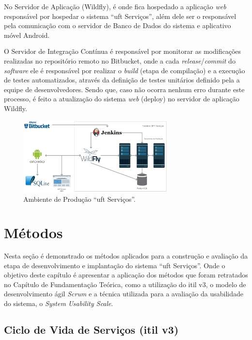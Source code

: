 No Servidor de Aplicação (Wildfly), é onde fica hospedado a aplicação \textit{web} responsável por hospedar o sistema ``\acrshort{uft} Serviços'', além dele ser o responsável pela comunicação com o servidor de Banco de Dados do sistema e aplicativo móvel Android.

O Servidor de Integração Contínua é responsável por monitorar as modificações realizadas no repositório remoto no Bitbucket, onde a cada \textit{release}/\textit{commit} do \textit{software} ele é responsável por realizar o \textit{build} (etapa de compilação) e a execução de testes automatizados, através da definição de testes unitários definido pela a equipe de desenvolvedores. Sendo que, caso não ocorra nenhum erro durante este processo, é feito a atualização do sistema \textit{web} (deploy) no servidor de aplicação Wildfly.

\begin{figure}[H]
  \centering
  \includegraphics[width=0.7\textwidth]{figuras/production.eps} 
  \caption{Ambiente de Produção ``\acrshort{uft} Serviços''.}
  \label{ambiente_prod} 
\end{figure}

\section{Métodos}

\noindent Nesta seção é demonstrado os métodos aplicados para a construção e avaliação da etapa de desenvolvimento e implantação do sistema ``\acrshort{uft} Serviços''. Onde o objetivo deste capítulo é apresentar a aplicação dos métodos que foram retratados no Capítulo de Fundamentação Teórica, como a utilização do \acrshort{itil} v3, o modelo de desenvolvimento ágil \textit{Scrum} e a técnica utilizada para a avaliação da usabilidade do sistema, o \textit{System Usability Scale}.

\subsection*{Ciclo de Vida de Serviços (\acrshort{itil} v3)}

